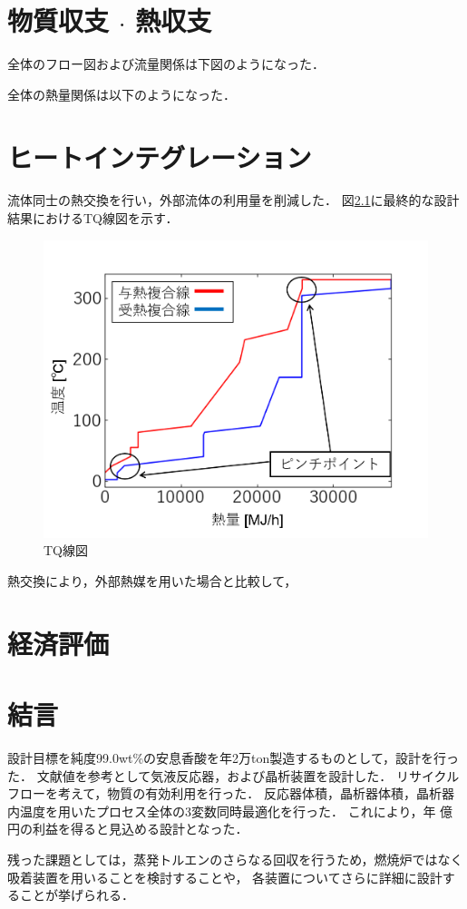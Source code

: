 \newpage
\chapter{物質収支 $\cdot$ 熱収支}
全体のフロー図および流量関係は下図のようになった．

全体の熱量関係は以下のようになった．

\newpage
\chapter{ヒートインテグレーション}
流体同士の熱交換を行い，外部流体の利用量を削減した．
図\ref{TQ線図}に最終的な設計結果におけるTQ線図を示す．
\begin{figure}[htbp]
    \label{TQ線図}
    \begin{center}
        \includegraphics[scale=0.7]{TQdiagram.png}
        \caption{TQ線図}
    \end{center}
\end{figure}

熱交換により，外部熱媒を用いた場合と比較して，

\newpage
\chapter{経済評価}

\newpage
\chapter{結言}
設計目標を純度99.0wt\%の安息香酸を年2万ton製造するものとして，設計を行った．
文献値を参考として気液反応器，および晶析装置を設計した．
リサイクルフローを考えて，物質の有効利用を行った．
反応器体積，晶析器体積，晶析器内温度を用いたプロセス全体の3変数同時最適化を行った．
これにより，年 億円の利益を得ると見込める設計となった．
\par
残った課題としては，蒸発トルエンのさらなる回収を行うため，燃焼炉ではなく吸着装置を用いることを検討することや，
各装置についてさらに詳細に設計することが挙げられる．

